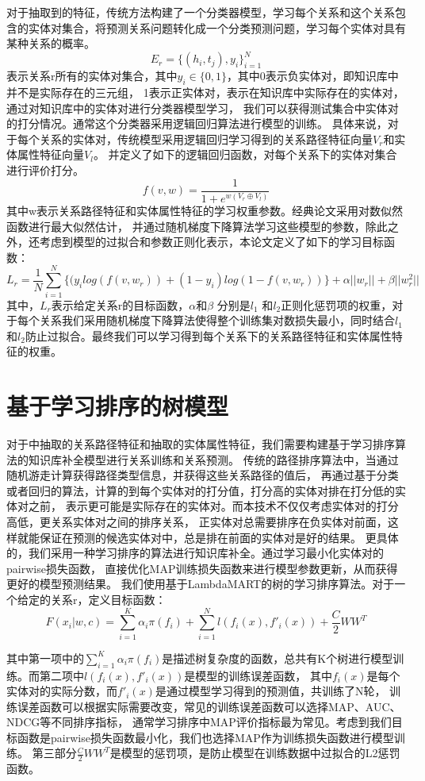 对于抽取到的特征，传统方法构建了一个分类器模型，学习每个关系和这个关系包含的实体对集合，将预测关系问题转化成一个分类预测问题，学习每个实体对具有某种关系的概率。
$$E_r=\{(h_i,t_j),y_i\}^N_{i=1} $$
表示关系r所有的实体对集合，其中$y_i\in \{0,1\}$，其中0表示负实体对，即知识库中并不是实际存在的三元组，
1表示正实体对，表示在知识库中实际存在的实体对，通过对知识库中的实体对进行分类器模型学习，
我们可以获得测试集合中实体对的打分情况。通常这个分类器采用逻辑回归算法进行模型的训练。
具体来说，对于每个关系的实体对，传统模型采用逻辑回归学习得到的关系路径特征向量$V_r$和实体属性特征向量$V_l$。
并定义了如下的逻辑回归函数，对每个关系下的实体对集合进行评价打分。
$$f(v,w)=\frac{1}{1+e^{w(V_r \oplus V_l)}}$$
其中w表示关系路径特征和实体属性特征的学习权重参数。经典论文采用对数似然函数进行最大似然估计，
并通过随机梯度下降算法学习这些模型的参数，除此之外，还考虑到模型的过拟合和参数正则化表示，本论文定义了如下的学习目标函数：
$$L_r=\frac{1}{N}\sum_{i=1}^N\{(y_ilog(f(v,w_r)) + (1-y_i)log(1-f(v,w_r))\}+\alpha ||w_r||+\beta||w_r^2||$$
其中，$L_r$表示给定关系r的目标函数，$\alpha$和$\beta$ 分别是$l_1$ 和$l_2$正则化惩罚项的权重，对于每个关系我们采用随机梯度下降算法使得整个训练集对数损失最小，同时结合$l_1$ 和$l_2$防止过拟合。最终我们可以学习得到每个关系下的关系路径特征和实体属性特征的权重。


\section{基于学习排序的树模型}
对于\label{sec:relational}中抽取的关系路径特征和\label{sec:literal}抽取的实体属性特征，我们需要构建基于学习排序算法的知识库补全模型进行关系训练和关系预测。
传统的路径排序算法中，当通过随机游走计算获得路径类型信息，并获得这些关系路径的值后，
再通过基于分类或者回归的算法，计算的到每个实体对的打分值，打分高的实体对排在打分低的实体对之前，
表示更可能是实际存在的实体对。而本技术不仅仅考虑实体对的打分高低，更关系实体对之间的排序关系，
正实体对总需要排序在负实体对前面，这样就能保证在预测的候选实体对中，总是排在前面的实体对是好的结果。
更具体的，我们采用一种学习排序的算法进行知识库补全。通过学习最小化实体对的pairwise损失函数，
直接优化MAP训练损失函数来进行模型参数更新，从而获得更好的模型预测结果。
我们使用基于LambdaMART的树的学习排序算法。对于一个给定的关系r，定义目标函数：
$$F(x_i|w,c)=\sum_{i=1}^K\alpha_i\pi(f_i)+\sum_{i=1}^Nl(f_i(x),f'_i(x))+\frac{C}{2}WW^T$$

其中第一项中的$\sum_{i=1}^K\alpha_i\pi(f_i)$是描述树复杂度的函数，总共有K个树进行模型训练。而第二项中$l(f_i(x),f'_i(x))$是模型的训练误差函数，
其中$f_i (x)$是每个实体对的实际分数，而$f'_i(x)$是通过模型学习得到的预测值，共训练了N轮，
训练误差函数可以根据实际需要改变，常见的训练误差函数可以选择MAP、AUC、NDCG等不同排序指标，
通常学习排序中MAP评价指标最为常见。考虑到我们目标函数是pairwise损失函数最小化，我们也选择MAP作为训练损失函数进行模型训练。
第三部分$\frac{C}{2}WW^T$是模型的惩罚项，是防止模型在训练数据中过拟合的L2惩罚函数。

